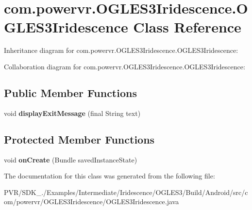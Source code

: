 \hypertarget{classcom_1_1powervr_1_1_o_g_l_e_s3_iridescence_1_1_o_g_l_e_s3_iridescence}{\section{com.\+powervr.\+O\+G\+L\+E\+S3\+Iridescence.\+O\+G\+L\+E\+S3\+Iridescence Class Reference}
\label{classcom_1_1powervr_1_1_o_g_l_e_s3_iridescence_1_1_o_g_l_e_s3_iridescence}
}


Inheritance diagram for com.\+powervr.\+O\+G\+L\+E\+S3\+Iridescence.\+O\+G\+L\+E\+S3\+Iridescence\+:


Collaboration diagram for com.\+powervr.\+O\+G\+L\+E\+S3\+Iridescence.\+O\+G\+L\+E\+S3\+Iridescence\+:
\subsection*{Public Member Functions}
\begin{DoxyCompactItemize}
\item 
\hypertarget{classcom_1_1powervr_1_1_o_g_l_e_s3_iridescence_1_1_o_g_l_e_s3_iridescence_a06fb52f1ff8bd8290bfcecb327f88b44}{void {\bfseries display\+Exit\+Message} (final String text)}\label{classcom_1_1powervr_1_1_o_g_l_e_s3_iridescence_1_1_o_g_l_e_s3_iridescence_a06fb52f1ff8bd8290bfcecb327f88b44}

\end{DoxyCompactItemize}
\subsection*{Protected Member Functions}
\begin{DoxyCompactItemize}
\item 
\hypertarget{classcom_1_1powervr_1_1_o_g_l_e_s3_iridescence_1_1_o_g_l_e_s3_iridescence_ac5c421e4edecfca414bed85074448b07}{void {\bfseries on\+Create} (Bundle saved\+Instance\+State)}\label{classcom_1_1powervr_1_1_o_g_l_e_s3_iridescence_1_1_o_g_l_e_s3_iridescence_ac5c421e4edecfca414bed85074448b07}

\end{DoxyCompactItemize}


The documentation for this class was generated from the following file\+:\begin{DoxyCompactItemize}
\item 
P\+V\+R/\+S\+D\+K\+\_./\+Examples/\+Intermediate/\+Iridescence/\+O\+G\+L\+E\+S3/\+Build/\+Android/src/com/powervr/\+O\+G\+L\+E\+S3\+Iridescence/O\+G\+L\+E\+S3\+Iridescence.\+java\end{DoxyCompactItemize}
